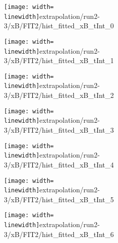 \begin{figure}
\begin{subfigure}{0.45\linewidth}
\texttt{[image: width=\\linewidth]}{extrapolation/run2-3/xB/FIT2/hist_fitted_xB_tInt_0}
\end{subfigure}
\begin{subfigure}{0.45\linewidth}
\texttt{[image: width=\\linewidth]}{extrapolation/run2-3/xB/FIT2/hist_fitted_xB_tInt_1}
\end{subfigure}
\begin{subfigure}{0.45\linewidth}
\texttt{[image: width=\\linewidth]}{extrapolation/run2-3/xB/FIT2/hist_fitted_xB_tInt_2}
\end{subfigure}
\begin{subfigure}{0.45\linewidth}
\texttt{[image: width=\\linewidth]}{extrapolation/run2-3/xB/FIT2/hist_fitted_xB_tInt_3}
\end{subfigure}
\begin{subfigure}{0.45\linewidth}
\texttt{[image: width=\\linewidth]}{extrapolation/run2-3/xB/FIT2/hist_fitted_xB_tInt_4}
\end{subfigure}
\begin{subfigure}{0.45\linewidth}
\texttt{[image: width=\\linewidth]}{extrapolation/run2-3/xB/FIT2/hist_fitted_xB_tInt_5}
\end{subfigure}
\begin{subfigure}{0.45\linewidth}
\texttt{[image: width=\\linewidth]}{extrapolation/run2-3/xB/FIT2/hist_fitted_xB_tInt_6}
\end{subfigure}
\end{figure}
